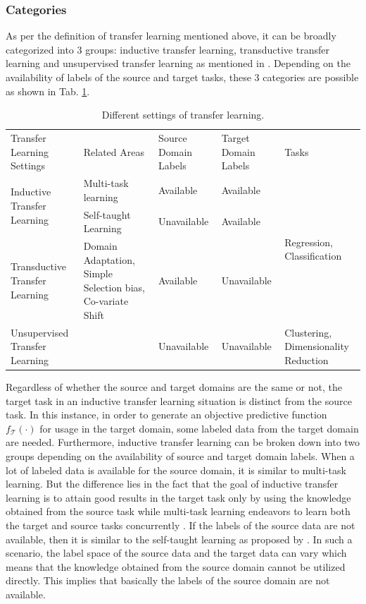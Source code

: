\subsubsection{Categories}
As per the definition of transfer learning mentioned above, it can be broadly categorized into 3 groups: inductive transfer learning, transductive transfer learning and unsupervised transfer learning as mentioned in \cite{pan2009survey}. Depending on the availability of labels of the source and target tasks, these 3 categories are possible as shown in Tab. \ref{tab:transfer_learning}.
\begin{table}[t]
  \centering
  \begin{tabular}{p{1.0in}|p{1.4in}|p{1.0in}|p{1.0in}|p{0.7in}}
  \toprule
    Transfer Learning Settings & Related Areas & Source Domain Labels & Target Domain Labels & Tasks \\\cline{1-5}
    \multirow{2}{1.0in}{Inductive Transfer Learning} & Multi-task learning & Available & Available & \multirow{3}{0.7in}{Regression, Classification} \\\cline{2-4}
    & Self-taught Learning & Unavailable & Available \\\cline{1-4}
    Transductive Transfer Learning & Domain Adaptation, Simple Selection bias, Co-variate Shift & Available & Unavailable \\\cline{1-5}
    Unsupervised Transfer Learning &  & Unavailable & Unavailable & Clustering, Dimensionality Reduction\\  
  \bottomrule    
  \end{tabular}
  \caption{Different settings of transfer learning.\cite{pan2009survey}}
  \label{tab:transfer_learning}
\end{table}
Regardless of whether the source and target domains are the same or not, the target task in an inductive transfer learning situation is distinct from the source task. In this instance, in order to generate an objective predictive function  $f_{\mathcal{T}}(\cdot)$ for usage in the target domain, some labeled data from the target domain are needed. Furthermore, inductive transfer learning can be broken down into two groups depending on the availability of source and target domain labels. When a lot of labeled data is available for the source domain, it is similar to multi-task learning. But the difference lies in the fact that the goal of inductive transfer learning is to attain good results in the target task only by using the knowledge obtained from the source task while multi-task learning endeavors to learn both the target and source tasks concurrently \cite{pan2009survey}. If the labels of the source data are not available, then it is similar to the self-taught learning as proposed by \cite{raina2007self}. In such a scenario, the label space of the source data and the target data can vary which means that the knowledge obtained from the source domain cannot be utilized directly. This implies that basically the labels of the source domain are not available.\cite{pan2009survey}

